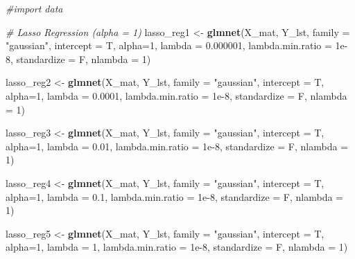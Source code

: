 \documentclass[
]{article}
\newenvironment{Shaded}{\begin{snugshade}}{\end{snugshade}}
\newcommand{\CommentTok}[1]{\textcolor[rgb]{0.56,0.35,0.01}{\textit{#1}}}
\newcommand{\DataTypeTok}[1]{\textcolor[rgb]{0.13,0.29,0.53}{#1}}
\newcommand{\DecValTok}[1]{\textcolor[rgb]{0.00,0.00,0.81}{#1}}
\newcommand{\FloatTok}[1]{\textcolor[rgb]{0.00,0.00,0.81}{#1}}
\newcommand{\KeywordTok}[1]{\textcolor[rgb]{0.13,0.29,0.53}{\textbf{#1}}}
\newcommand{\NormalTok}[1]{#1}
\newcommand{\StringTok}[1]{\textcolor[rgb]{0.31,0.60,0.02}{#1}}
\begin{document}
\begin{Shaded}
\begin{Highlighting}[]
\CommentTok{#import data}




\CommentTok{# Lasso Regression (alpha = 1)}
\NormalTok{lasso_reg1 <-}\StringTok{ }\KeywordTok{glmnet}\NormalTok{(X_mat, Y_lst, }\DataTypeTok{family =} \StringTok{"gaussian"}\NormalTok{, }\DataTypeTok{intercept =}\NormalTok{ T,}
\DataTypeTok{alpha=}\DecValTok{1}\NormalTok{, }\DataTypeTok{lambda =} \FloatTok{0.000001}\NormalTok{, }\DataTypeTok{lambda.min.ratio =} \FloatTok{1e-8}\NormalTok{,}
\DataTypeTok{standardize =}\NormalTok{ F, }\DataTypeTok{nlambda =} \DecValTok{1}\NormalTok{)}

\NormalTok{lasso_reg2 <-}\StringTok{ }\KeywordTok{glmnet}\NormalTok{(X_mat, Y_lst, }\DataTypeTok{family =} \StringTok{"gaussian"}\NormalTok{, }\DataTypeTok{intercept =}\NormalTok{ T,}
\DataTypeTok{alpha=}\DecValTok{1}\NormalTok{, }\DataTypeTok{lambda =} \FloatTok{0.0001}\NormalTok{, }\DataTypeTok{lambda.min.ratio =} \FloatTok{1e-8}\NormalTok{,}
\DataTypeTok{standardize =}\NormalTok{ F, }\DataTypeTok{nlambda =} \DecValTok{1}\NormalTok{)}

\NormalTok{lasso_reg3 <-}\StringTok{ }\KeywordTok{glmnet}\NormalTok{(X_mat, Y_lst, }\DataTypeTok{family =} \StringTok{"gaussian"}\NormalTok{, }\DataTypeTok{intercept =}\NormalTok{ T,}
\DataTypeTok{alpha=}\DecValTok{1}\NormalTok{, }\DataTypeTok{lambda =} \FloatTok{0.01}\NormalTok{, }\DataTypeTok{lambda.min.ratio =} \FloatTok{1e-8}\NormalTok{,}
\DataTypeTok{standardize =}\NormalTok{ F, }\DataTypeTok{nlambda =} \DecValTok{1}\NormalTok{)}

\NormalTok{lasso_reg4 <-}\StringTok{ }\KeywordTok{glmnet}\NormalTok{(X_mat, Y_lst, }\DataTypeTok{family =} \StringTok{"gaussian"}\NormalTok{, }\DataTypeTok{intercept =}\NormalTok{ T,}
\DataTypeTok{alpha=}\DecValTok{1}\NormalTok{, }\DataTypeTok{lambda =} \FloatTok{0.1}\NormalTok{, }\DataTypeTok{lambda.min.ratio =} \FloatTok{1e-8}\NormalTok{,}
\DataTypeTok{standardize =}\NormalTok{ F, }\DataTypeTok{nlambda =} \DecValTok{1}\NormalTok{)}

\NormalTok{lasso_reg5 <-}\StringTok{ }\KeywordTok{glmnet}\NormalTok{(X_mat, Y_lst, }\DataTypeTok{family =} \StringTok{"gaussian"}\NormalTok{, }\DataTypeTok{intercept =}\NormalTok{ T,}
\DataTypeTok{alpha=}\DecValTok{1}\NormalTok{, }\DataTypeTok{lambda =} \DecValTok{1}\NormalTok{, }\DataTypeTok{lambda.min.ratio =} \FloatTok{1e-8}\NormalTok{,}
\DataTypeTok{standardize =}\NormalTok{ F, }\DataTypeTok{nlambda =} \DecValTok{1}\NormalTok{)}



\end{Highlighting}
\end{Shaded}
\end{document}
